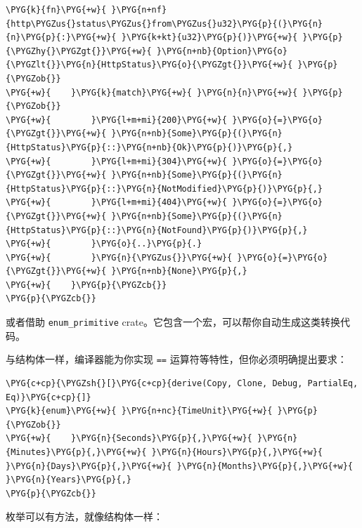 \begin{Verbatim}[commandchars=\\\{\},breaklines=true,breakanywhere=true,fontsize=\codefont,xleftmargin=17bp]
\PYG{k}{fn}\PYG{+w}{ }\PYG{n+nf}{http\PYGZus{}status\PYGZus{}from\PYGZus{}u32}\PYG{p}{(}\PYG{n}{n}\PYG{p}{:}\PYG{+w}{ }\PYG{k+kt}{u32}\PYG{p}{)}\PYG{+w}{ }\PYG{p}{\PYGZhy{}\PYGZgt{}}\PYG{+w}{ }\PYG{n+nb}{Option}\PYG{o}{\PYGZlt{}}\PYG{n}{HttpStatus}\PYG{o}{\PYGZgt{}}\PYG{+w}{ }\PYG{p}{\PYGZob{}}
\PYG{+w}{    }\PYG{k}{match}\PYG{+w}{ }\PYG{n}{n}\PYG{+w}{ }\PYG{p}{\PYGZob{}}
\PYG{+w}{        }\PYG{l+m+mi}{200}\PYG{+w}{ }\PYG{o}{=}\PYG{o}{\PYGZgt{}}\PYG{+w}{ }\PYG{n+nb}{Some}\PYG{p}{(}\PYG{n}{HttpStatus}\PYG{p}{::}\PYG{n+nb}{Ok}\PYG{p}{)}\PYG{p}{,}
\PYG{+w}{        }\PYG{l+m+mi}{304}\PYG{+w}{ }\PYG{o}{=}\PYG{o}{\PYGZgt{}}\PYG{+w}{ }\PYG{n+nb}{Some}\PYG{p}{(}\PYG{n}{HttpStatus}\PYG{p}{::}\PYG{n}{NotModified}\PYG{p}{)}\PYG{p}{,}
\PYG{+w}{        }\PYG{l+m+mi}{404}\PYG{+w}{ }\PYG{o}{=}\PYG{o}{\PYGZgt{}}\PYG{+w}{ }\PYG{n+nb}{Some}\PYG{p}{(}\PYG{n}{HttpStatus}\PYG{p}{::}\PYG{n}{NotFound}\PYG{p}{)}\PYG{p}{,}
\PYG{+w}{        }\PYG{o}{..}\PYG{p}{.}
\PYG{+w}{        }\PYG{n}{\PYGZus{}}\PYG{+w}{ }\PYG{o}{=}\PYG{o}{\PYGZgt{}}\PYG{+w}{ }\PYG{n+nb}{None}\PYG{p}{,}
\PYG{+w}{    }\PYG{p}{\PYGZcb{}}
\PYG{p}{\PYGZcb{}}
\end{Verbatim}

或者借助 \texttt{enum\_primitive} crate。它包含一个宏，可以帮你自动生成这类转换代码。

与结构体一样，编译器能为你实现 \texttt{==} 运算符等特性，但你必须明确提出要求：

\begin{Verbatim}[commandchars=\\\{\},breaklines=true,breakanywhere=true,fontsize=\codefont,xleftmargin=17bp]
\PYG{c+cp}{\PYGZsh{}[}\PYG{c+cp}{derive(Copy, Clone, Debug, PartialEq, Eq)}\PYG{c+cp}{]}
\PYG{k}{enum}\PYG{+w}{ }\PYG{n+nc}{TimeUnit}\PYG{+w}{ }\PYG{p}{\PYGZob{}}
\PYG{+w}{    }\PYG{n}{Seconds}\PYG{p}{,}\PYG{+w}{ }\PYG{n}{Minutes}\PYG{p}{,}\PYG{+w}{ }\PYG{n}{Hours}\PYG{p}{,}\PYG{+w}{ }\PYG{n}{Days}\PYG{p}{,}\PYG{+w}{ }\PYG{n}{Months}\PYG{p}{,}\PYG{+w}{ }\PYG{n}{Years}\PYG{p}{,}
\PYG{p}{\PYGZcb{}}
\end{Verbatim}

枚举可以有方法，就像结构体一样：

